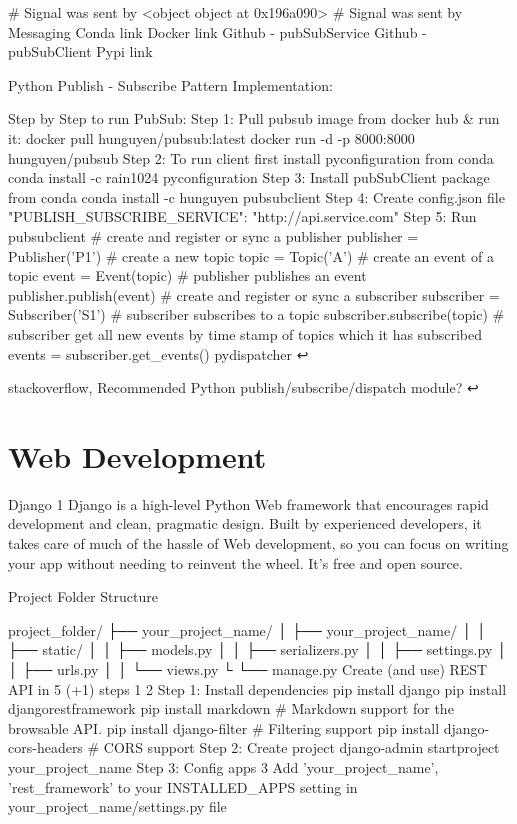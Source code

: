     # Signal was sent by <object object at 0x196a090>
    # Signal was sent by {}
Messaging
Conda link Docker link Github - pubSubService Github - pubSubClient Pypi link

Python Publish - Subscribe Pattern Implementation:

Step by Step to run PubSub:
Step 1: Pull pubsub image from docker hub & run it:
docker pull hunguyen/pubsub:latest
docker run -d -p 8000:8000 hunguyen/pubsub
Step 2: To run client first install pyconfiguration from conda
conda install -c rain1024 pyconfiguration
Step 3: Install pubSubClient package from conda
conda install -c hunguyen pubsubclient
Step 4: Create config.json file
{
  "PUBLISH_SUBSCRIBE_SERVICE": "http://api.service.com"
}
Step 5: Run pubsubclient
# create and register or sync a publisher
publisher = Publisher('P1')
# create a new topic
topic = Topic('A')
# create an event of a topic
event = Event(topic)
# publisher publishes an event
publisher.publish(event)
# create and register or sync a subscriber
subscriber = Subscriber('S1')
# subscriber subscribes to a topic
subscriber.subscribe(topic)
# subscriber get all new events by time stamp of topics which it has subscribed
events = subscriber.get_events()
pydispatcher ↩

stackoverflow, Recommended Python publish/subscribe/dispatch module? ↩

\section{Web Development}

Django 1
Django is a high-level Python Web framework that encourages rapid development and clean, pragmatic design. Built by experienced developers, it takes care of much of the hassle of Web development, so you can focus on writing your app without needing to reinvent the wheel. It’s free and open source.

Project Folder Structure

project_folder/
├── your_project_name/
│   ├── your_project_name/
│   │   ├── static/
│   │   ├── models.py
│   │   ├── serializers.py
│   │   ├── settings.py
│   │   ├── urls.py
│   │   └── views.py
└   └── manage.py
Create (and use) REST API in 5 (+1) steps 1 2
Step 1: Install dependencies
pip install django
pip install djangorestframework
pip install markdown             # Markdown support for the browsable API.
pip install django-filter        # Filtering support
pip install django-cors-headers  # CORS support
Step 2: Create project
django-admin startproject your_project_name
Step 3: Config apps 3
Add 'your_project_name', 'rest_framework' to your INSTALLED_APPS setting in your_project_name/settings.py file

